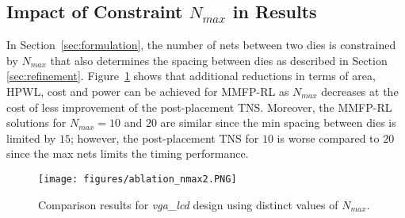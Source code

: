 \subsection{Impact of Constraint $N_{max}$ in Results}
In Section~\ref{sec:formulation}, the number of nets between two dies is constrained by $N_{max}$ that also determines the spacing between dies as described in Section \ref{sec:refinement}. Figure~\ref{fig:ablation_nmax} shows that additional reductions in terms of area, HPWL, cost and power can be achieved for MMFP-RL as $N_{max}$ decreases at the cost of less improvement of the post-placement TNS. Moreover, the MMFP-RL solutions for $N_{max}{=}10$ and $20$ are similar  since the min spacing between dies is limited by $15$; however, the post-placement TNS for $10$ is worse compared to $20$ since the max nets limits the timing performance.

\begin{figure}[ht]
\centering
\texttt{[image: figures/ablation\_nmax2.PNG]}
\caption{Comparison results for \emph{vga\_lcd} design using distinct values of $N_{max}$.}
\label{fig:ablation_nmax}
\end{figure}